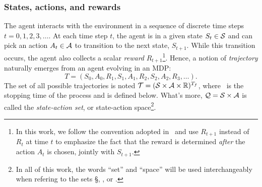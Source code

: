 			\subsubsection{States, actions, and rewards} 
				The agent interacts with the environment in a sequence of discrete time steps $t = 0, 1, 2, 3, \hdots$. At each time step $t$, the agent is in a given state $S_t \in \S$ and can pick an action $A_t \in \A$ to transition to the next state, $S_{t+1}$. While this transition occurs, the agent also collects a scalar \emph{reward} $R_{t+1}$\footnote{In this work, we follow the convention adopted in~\cite{sutton2018reinforcement} and use $R_{t+1}$ instead of $R_t$ at time $t$ to emphasize the fact that the reward is determined\emph{ after} the action $A_t$ is chosen, jointly with $S_{t+1}$.}. Hence, a notion of\emph{ trajectory} naturally emerges from an agent evolving in an MDP:
				\begin{equation*}
					T = (S_0, A_0, R_1, S_1, A_1, R_2, S_2, A_2, R_3, \hdots).
				\end{equation*}
				The set of all possible trajectories is noted $\T = (\S\times\A\times\R)^\Tf$, where \Tf~is the stopping time of the process and is defined below. What's more, $\Q = \S\times\A$ is called the\emph{ state-action set}, or state-action space\footnote{In all of this work, the words \enquote{set} and \enquote{space} will be used interchangeably when refering to the sets \S, \A, or \Q.}.

